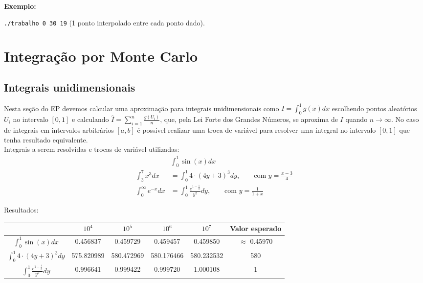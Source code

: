 \documentclass[leqno]{article}
\begin{document}
\textbf{Exemplo:}

\texttt{./trabalho 0 30 19} (1 ponto interpolado entre cada ponto dado).

\section{Integração por Monte Carlo}

\subsection{Integrais unidimensionais}
Nesta seção do EP devemos calcular uma aproximação para integrais unidimensionais
como $I = \int_0^1 g(x) dx$ escolhendo pontos aleatórios $U_i$ no intervalo $[0,1]$ e
calculando $\hat{I} = \sum_{i=1}^n \frac{g(U_i)}{n}$, que, pela Lei Forte dos
Grandes Números, se aproxima de $I$ quando $n \to \infty$. No caso de integrais
em intervalos arbitrários $[a,b]$ é possível realizar uma troca de variável para
resolver uma integral no intervalo $[0,1]$ que tenha resultado equivalente. \\

Integrais a serem resolvidas e trocas de variável utilizadas:
\begin{align}
    &\int_0^1 \sin(x) dx \\
    \int_3^7 x^3 dx &= \int_0^1 4 \cdot (4y+3)^3 dy, \qquad \text{com } y = \frac{x-3}{4}\\
    \int_0^\infty e^{-x} dx &= \int_0^1 \frac{e^{1-\frac 1y}}{y^2} dy, \qquad \text{com } y = \frac{1}{1+x}
\end{align}


Resultados:
\begin{table}[H]
    \centering
    \begin{tabular}{c|c|c|c|c|c|}
    \cline{2-6}
                            & $10^4$ & $10^5$ & $10^6$ & $10^7$ & Valor esperado \\ \hline
    \multicolumn{1}{|c|}{$\int_0^1 \sin(x) dx$} &  0.456837          &  0.459729          &  0.459457      &  0.459850   & $\approx$ 0.45970  \\ \hline
    \multicolumn{1}{|c|}{$\int_0^1 4 \cdot (4y+3)^3 dy$} &  575.820989        &  580.472969        &  580.176466    &  580.232532 &  580               \\ \hline
    \multicolumn{1}{|c|}{$\int_0^1 \frac{e^{1-\frac 1y}}{y^2} dy$} &  0.996641          &  0.999422          &  0.999720      &  1.000108   &  1                 \\ \hline
    \end{tabular}
\end{table}
\end{document}
